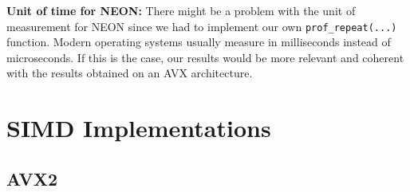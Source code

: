 \documentclass{article}
\newcommand{\pointlabel}[1]{\par\smallskip\noindent\textbf{\textcolor{accentorange}{#1:}} }
\begin{document}
\pointlabel{Unit of time for NEON} There might be a problem with the unit of measurement for NEON since we had to implement our own \texttt{prof\_repeat(...)} function. Modern operating systems usually measure in milliseconds instead of microseconds. If this is the case, our results would be more relevant and coherent with the results obtained on an AVX architecture.

\printbibliography


\newpage
\appendix
\section{SIMD Implementations}
\label{app:code}


\subsection{AVX2}
\end{document}
